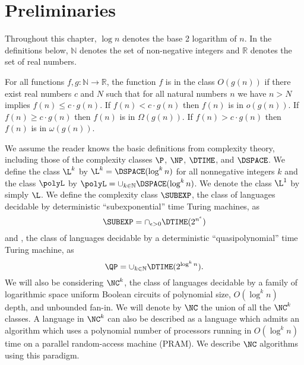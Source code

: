 
\section{Preliminaries}

Throughout this chapter, $\log n$ denotes the base 2 logarithm of $n$.
In the definitions below, $\mathbb{N}$ denotes the set of non-negative integers and $\mathbb{R}$ denotes the set of real numbers.

\begin{definition}
  For all functions $f, g \colon \mathbb{N} \to \mathbb{R}$, the function $f$ is in the class $O(g(n))$ if there exist real numbers $c$ and $N$ such that for all natural numbers $n$ we have $n > N$ implies $f(n) \leq c \cdot g(n)$.
  If $f(n) < c \cdot g(n)$ then $f(n)$ is in $o(g(n))$.
  If $f(n) \geq c \cdot g(n)$ then $f(n)$ is in $\Omega(g(n))$.
  If $f(n) > c \cdot g(n)$ then $f(n)$ is in $\omega(g(n))$.
\end{definition}

We assume the reader knows the basic definitions from complexity theory, including those of the complexity classes $\P$, $\NP$, $\DTIME$, and $\DSPACE$.
We define the class $\L^k$ by $\L^k = \DSPACE(\log^k n)$ for all nonnegative integers $k$ and the class $\polyL$ by $\polyL = \cup_{k \in \mathbb{N}} \DSPACE(\log^k n)$.
We denote the class $\L^1$ by simply $\L$.
We define the complexity class $\SUBEXP$, the class of languages decidable by deterministic ``subexponential'' time Turing machines, as
\begin{equation*}
  \SUBEXP = \cap_{\epsilon > 0} \DTIME(2^{n^\epsilon})
\end{equation*}
and \QP{}, the class of languages decidable by a deterministic ``quasipolynomial'' time Turing machine, as
\begin{equation*}
  \QP = \cup_{k \in \mathbb{N}} \DTIME(2^{\log^k n}).
\end{equation*}
We will also be considering $\NC^k$, the class of languages decidable by a family of logarithmic space uniform Boolean circuits of polynomial size, $O(\log^k n)$ depth, and unbounded fan-in.
We will denote by $\NC$ the union of all the $\NC^k$ classes.
A language in $\NC^k$ can also be described as a language which admits an algorithm which uses a polynomial number of processors running in $O(\log^k n)$ time on a parallel random-access machine (PRAM).
We describe $\NC$ algorithms using this paradigm.

